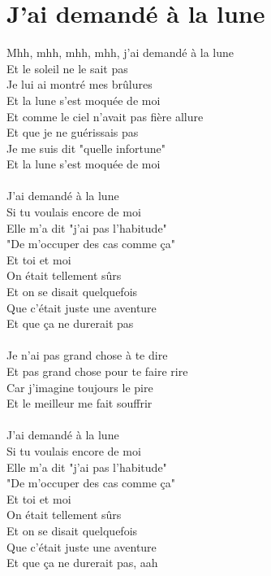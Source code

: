 \section*{J'ai demandé à la lune}
Mhh, mhh, mhh, mhh, j'ai demandé à la lune\\
Et le soleil ne le sait pas\\
Je lui ai montré mes brûlures\\
Et la lune s'est moquée de moi\\
Et comme le ciel n'avait pas fière allure\\
Et que je ne guérissais pas\\
Je me suis dit "quelle infortune"\\
Et la lune s'est moquée de moi\\\\
J'ai demandé à la lune\\
Si tu voulais encore de moi\\
Elle m'a dit "j'ai pas l'habitude"\\
"De m'occuper des cas comme ça"\\
Et toi et moi\\
On était tellement sûrs\\
Et on se disait quelquefois\\
Que c'était juste une aventure\\
Et que ça ne durerait pas\\\\
Je n'ai pas grand chose à te dire\\
Et pas grand chose pour te faire rire\\
Car j'imagine toujours le pire\\
Et le meilleur me fait souffrir\\\\
J'ai demandé à la lune\\
Si tu voulais encore de moi\\
Elle m'a dit "j'ai pas l'habitude"\\
"De m'occuper des cas comme ça"\\
Et toi et moi\\
On était tellement sûrs\\
Et on se disait quelquefois\\
Que c'était juste une aventure\\
Et que ça ne durerait pas, aah\\
